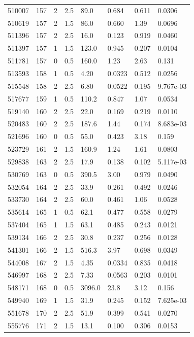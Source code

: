 \documentclass[preview]{standalone}
\begin{document}
{{{{{{{\begin{tabular}{L{1.2cm}C{1.2cm} C{0.3cm}C{0.5cm} C{1.4cm}C{1.4cm} C{1.4cm}C{1.4cm}}
  510007  &   157  & 2     & 2.5 &  89.0  & 0.684  & 0.611 &  0.0306   \\ 
  510619  &   157  & 2     & 1.5 &  86.0  & 0.660  & 1.39 &  0.0696   \\ 
  511396  &   157  & 2     & 2.5 &  16.0  & 0.123  & 0.919 &  0.0460   \\ 
  511397  &   157  & 1     & 1.5 &  123.0  & 0.945  & 0.207 &  0.0104   \\ 
  511781  &   157  & 0     & 0.5 &  160.0  & 1.23  & 2.63 &  0.131   \\ 
  513593  &   158  & 1     & 0.5 &  4.20  & 0.0323  & 0.512 &  0.0256   \\ 
  515548  &   158  & 2     & 2.5 &  6.80  & 0.0522  & 0.195 &  9.767e-03   \\ 
  517677  &   159  & 1     & 0.5 &  110.2  & 0.847  & 1.07 &  0.0534   \\ 
  519140  &   160  & 2     & 2.5 &  22.0  & 0.169  & 0.219 &  0.0110   \\ 
  520483  &   160  & 2     & 2.5 &  187.6  & 1.44  & 0.174 &  8.683e-03   \\ 
  521696  &   160  & 0     & 0.5 &  55.0  & 0.423  & 3.18 &  0.159   \\ 
  523729  &   161  & 2     & 1.5 &  160.9  & 1.24  & 1.61 &  0.0803   \\ 
  529838  &   163  & 2     & 2.5 &  17.9  & 0.138  & 0.102 &  5.117e-03   \\ 
  530769  &   163  & 0     & 0.5 &  390.5  & 3.00  & 0.979 &  0.0490   \\ 
  532054  &   164  & 2     & 2.5 &  33.9  & 0.261  & 0.492 &  0.0246   \\ 
  533730  &   164  & 2     & 2.5 &  60.0  & 0.461  & 1.06 &  0.0528   \\ 
  535614  &   165  & 1     & 0.5 &  62.1  & 0.477  & 0.558 &  0.0279   \\ 
  537404  &   165  & 1     & 1.5 &  63.1  & 0.485  & 0.243 &  0.0121   \\ 
  539134  &   166  & 2     & 2.5 &  30.8  & 0.237  & 0.256 &  0.0128   \\ 
  541301  &   166  & 2     & 1.5 &  516.3  & 3.97  & 0.698 &  0.0349   \\ 
  544008  &   167  & 2     & 1.5 &  4.35  & 0.0334  & 0.835 &  0.0418   \\ 
  546997  &   168  & 2     & 2.5 &  7.33  & 0.0563  & 0.203 &  0.0101   \\ 
  548171  &   168  & 0     & 0.5 &  3096.0  & 23.8  & 3.12 &  0.156   \\ 
  549940  &   169  & 1     & 1.5 &  31.9  & 0.245  & 0.152 &  7.625e-03   \\ 
  551678  &   170  & 2     & 2.5 &  51.9  & 0.399  & 0.541 &  0.0270   \\ 
  555776  &   171  & 2     & 1.5 &  13.1  & 0.100  & 0.306 &  0.0153   \\ 
\hline 
\end{tabular} 

}}}}}}}
\end{document}
